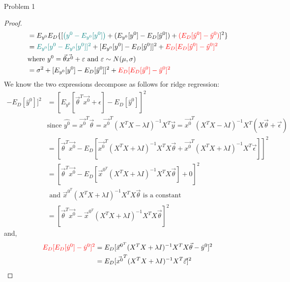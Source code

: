 \documentclass[a4paper]{article}
\begin{document}
\begin{note}{Problem 1}
\begin{enumerate}
\begin{proof}
\begin{align*}
                                         &= E_{y^0} E_D \{[ \textcolor{teal}{\left( y^0 - E_{y^0} [y^0] \right)} +  
        (E_{y^0} [y^0] - E_D[\hat{y}^0]) + \textcolor{red}{(E_D[\hat{y}^0] - \hat{y}^0)}]^2 \} \\
                                         &= \textcolor{teal}{E_{y^0}[y^0 - E_{y^0} [y^0]]^2} + [E_{y^0} [y^0] - E_D[\hat{y}^0]]^2 
                                       + \textcolor{red} {E_D[E_D[\hat{y}^0] - \hat{y}^0]^2} \\
                                         & \text{where $y^0 = \vec{\theta} \vec{x^0} + \epsilon$ and $\epsilon \sim N(\mu, \sigma)$} \\ 
                                         &= \sigma^2 + [E_{y^0} [y^0] - E_D[\hat{y}^0]]^2 
                                       + \textcolor{red} {E_D[E_D[\hat{y}^0] - \hat{y}^0]^2} 
      \end{align*}
      We know the two expressions decompose as follows for ridge regression:
      \begin{align*}
        [E_{y^0} [y^0] - E_D[\hat{y}^0]]^2 &= [E_{y^0} [\vec{\theta}^T \vec{x^0} + \epsilon] - E_D[\hat{y}^0]]^2 \\
                                           & \text{since $\hat{y^0} = \vec{x^0}^T \vec{\theta} = \vec{x^0}^T (X^T X - \lambda I)^{-1} X^T \vec{y} = \vec{x^0}^T (X^T X - \lambda I)^{-1} X^T (X \vec{\theta} + \vec{\epsilon})$} \\
                                           &= [\vec{\theta}^T \vec{x^0} - E_D[\vec{x^0}^T(X^T X + \lambda I)^{-1}X^T X \vec{\theta} +
                                           \vec{x^0}^T(X^T X + \lambda I)^{-1} X^T \vec{\epsilon}]]^2 \\
                                           &= [\vec{\theta}^T \vec{x^0} - E_D[\vec{x}^{0^T}(X^T X + \lambda I)^{-1}X^T X \vec{\theta}] + 0]^2 \\
                                           & \text{ and $\vec{x}^{0^T}(X^T X + \lambda I)^{-1}X^T X \vec{\theta}$ is a constant} \\
                                           &= [\vec{\theta}^T \vec{x^0} - \vec{x}^{0^T}(X^T X + \lambda I)^{-1}X^T X \vec{\theta}]^2
      \end{align*}
      and,
      \begin{align*}
        \textcolor{red} {E_D[E_D[\hat{y}^0] - \hat{y}^0]^2} &= E_D[\vec{x}^{0^T}(X^T X + \lambda I)^{-1}X^T X \vec{\theta} -\hat{y}^0]^2 \\
                                                            &= E_D[\vec{x^0}^T(X^T X + \lambda I)^{-1} X^T \vec{\epsilon}]^2 \\

\end{align*}
\end{proof}
\end{enumerate}
\end{note}
\end{document}
